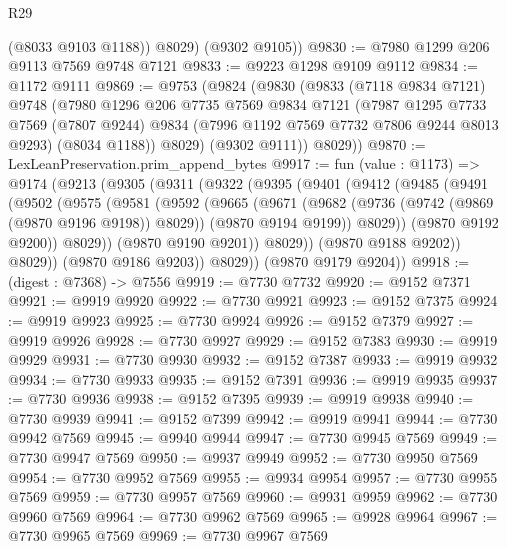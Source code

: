 \begin{lexlean}{R29}
\begin{coremodule}
          (@8033 @9103 @1188))
        @8029)
      (@9302 @9105))
@9830 := @7980 @1299 @206 @9113 @7569 @9748 @7121
@9833 := @9223 @1298 @9109 @9112
@9834 := @1172 @9111
@9869 := @9753
    (@9824
      (@9830
        (@9833
          (@7118 @9834 @7121)
          @9748
          (@7980
            @1296
            @206
            @7735
            @7569
            @9834
            @7121
            (@7987
              @1295
              @7733
              @7569
              (@7807 @9244)
              @9834
              (@7996 @1192 @7569 @7732 @7806 @9244 @8013 @9293)
              (@8034 @1188))
            @8029)
          (@9302 @9111))
        @8029))
@9870 := LexLeanPreservation.prim_append_bytes
@9917 := fun (value : @1173) =>
  @9174
    (@9213
      (@9305
        (@9311
          (@9322
            (@9395
              (@9401
                (@9412
                  (@9485
                    (@9491
                      (@9502
                        (@9575
                          (@9581
                            (@9592
                              (@9665
                                (@9671
                                  (@9682
                                    (@9736 (@9742 (@9869 (@9870 @9196 @9198)) @8029))
                                    (@9870 @9194 @9199))
                                  @8029))
                              (@9870 @9192 @9200))
                            @8029))
                        (@9870 @9190 @9201))
                      @8029))
                  (@9870 @9188 @9202))
                @8029))
            (@9870 @9186 @9203))
          @8029))
      (@9870 @9179 @9204))
@9918 := (digest : @7368) -> @7556
@9919 := @7730 @7732
@9920 := @9152 @7371
@9921 := @9919 @9920
@9922 := @7730 @9921
@9923 := @9152 @7375
@9924 := @9919 @9923
@9925 := @7730 @9924
@9926 := @9152 @7379
@9927 := @9919 @9926
@9928 := @7730 @9927
@9929 := @9152 @7383
@9930 := @9919 @9929
@9931 := @7730 @9930
@9932 := @9152 @7387
@9933 := @9919 @9932
@9934 := @7730 @9933
@9935 := @9152 @7391
@9936 := @9919 @9935
@9937 := @7730 @9936
@9938 := @9152 @7395
@9939 := @9919 @9938
@9940 := @7730 @9939
@9941 := @9152 @7399
@9942 := @9919 @9941
@9944 := @7730 @9942 @7569
@9945 := @9940 @9944
@9947 := @7730 @9945 @7569
@9949 := @7730 @9947 @7569
@9950 := @9937 @9949
@9952 := @7730 @9950 @7569
@9954 := @7730 @9952 @7569
@9955 := @9934 @9954
@9957 := @7730 @9955 @7569
@9959 := @7730 @9957 @7569
@9960 := @9931 @9959
@9962 := @7730 @9960 @7569
@9964 := @7730 @9962 @7569
@9965 := @9928 @9964
@9967 := @7730 @9965 @7569
@9969 := @7730 @9967 @7569

\end{coremodule}
\end{lexlean}
